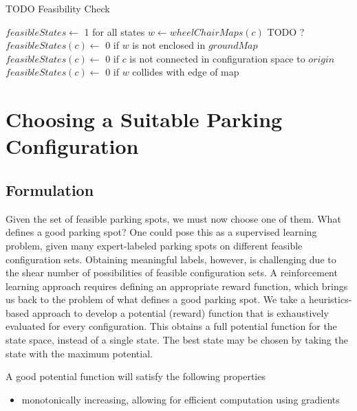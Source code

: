 \begin{algorithm}
\caption{TODO Feasibility Check}
\label{alg:feasibilitycheck}
\begin{algorithmic}[1]
\Statex
{}
    \State $feasibleStates \gets$ 1 for all states
        \State $w \gets wheelChairMaps(c)$ TODO ?
        \State $feasibleStates(c) \gets$ 0 if $w$ is not enclosed in $groundMap$
        \State $feasibleStates(c) \gets$ 0 if $c$ is not connected in configuration space to $origin$
        \State $feasibleStates(c) \gets$ 0 if $w$ collides with edge of map
    \EndFor
\EndFunction
\Statex
{}
\end{algorithmic}
\end{algorithm}

\section{Choosing a Suitable Parking Configuration}
\label{sec:choosingparkingspot}
\subsection{Formulation}
Given the set of feasible parking spots, we must now choose one of them. What
defines a good parking spot? One could pose this as a supervised learning
problem, given many expert-labeled parking spots on different feasible
configuration sets.  Obtaining meaningful labels, however, is challenging due to
the shear number of possibilities of feasible configuration sets. A
reinforcement learning approach requires defining an appropriate reward
function, which brings us back to the problem of what defines a good parking
spot. We take a heuristics-based approach to develop a potential (reward)
function that is exhaustively evaluated for every configuration.
This obtains a full potential function for the state space, instead of a single
state. The best state may be chosen by taking the state with the maximum
potential.

A good potential function will satisfy the following properties
\begin{itemize}
\item monotonically increasing, allowing for efficient computation
using gradients
\end{itemize}

